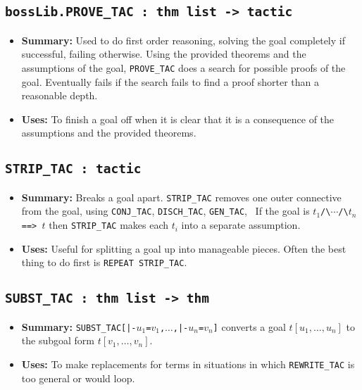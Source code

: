 \subsection{\tt bossLib.PROVE\_TAC : thm list -> tactic}

\begin{itemize}
\item {\bf Summary:} Used to do first order reasoning, solving the
  goal completely if successful, failing otherwise.  Using the
  provided theorems and the assumptions of the goal,
  {\small\verb|PROVE_TAC|} does a search for possible proofs of the
  goal.  Eventually fails if the search fails to find a proof shorter
  than a reasonable depth.
\item {\bf Uses:} To finish a goal off when it is clear that it is a
  consequence of the assumptions and the provided theorems.
\end{itemize}


\subsection{\tt STRIP\_TAC : tactic}

\begin{itemize}

\item{\bf Summary:} Breaks a goal apart.  {\small\verb|STRIP_TAC|}
  removes one outer connective from the goal, using
  {\small\verb|CONJ_TAC|}, {\small\verb|DISCH_TAC|},
  {\small\verb|GEN_TAC|}, \etc\ If the goal is
$t_1${\small\verb|/\|}$\cdots${\small\verb|/\|}$t_n${\small\verb| ==> |}$t$
then {\small\verb|STRIP_TAC|} makes each $t_i$ into a separate assumption.

\item{\bf Uses:} Useful for splitting a goal up into manageable pieces.
Often the best thing to do first is {\small\verb|REPEAT STRIP_TAC|}.
\end{itemize}

\subsection{\tt SUBST\_TAC : thm list -> thm}

\begin{itemize}

\item{\bf Summary:}
  {\small\verb+SUBST_TAC[|-+}$u_1${\small\verb|=|}$v_1${\small\verb|,|}$\ldots${\small\verb+,|-+}$u_n${\small\verb|=|}$v_n${\small\verb|]|}
  converts a goal $t[u_1,\ldots ,u_n]$ to the subgoal form
  $t[v_1,\ldots ,v_n]$.

\item{\bf Uses:} To make replacements for terms in situations in which
  {\small\verb|REWRITE_TAC|} is too general or would loop.
\end{itemize}


